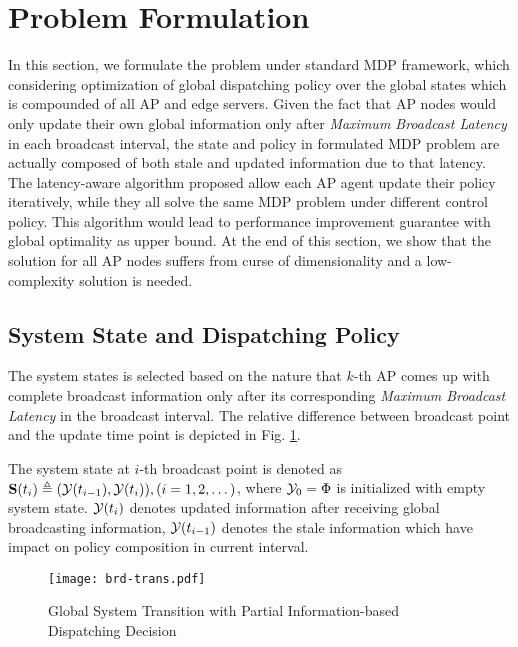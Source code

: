 \section{Problem Formulation}
In this section, we formulate the problem under standard MDP framework, which considering optimization of global dispatching policy over the global states which is compounded of all AP and edge servers.
Given the fact that AP nodes would only update their own global information only after \emph{Maximum Broadcast Latency} in each broadcast interval, the state and policy in formulated MDP problem are actually composed of both stale and updated information due to that latency.
The latency-aware algorithm proposed allow each AP agent update their policy iteratively, while they all solve the same MDP problem under different control policy. This algorithm would lead to performance improvement guarantee with global optimality as upper bound.
At the end of this section, we show that the solution for all AP nodes suffers from curse of dimensionality and a low-complexity solution is needed.

\subsection{System State and Dispatching Policy}
The system states is selected based on the nature that $k$-th AP comes up with complete broadcast information only after its corresponding \emph{Maximum Broadcast Latency} in the broadcast interval.
The relative difference between broadcast point and the update time point is depicted in Fig. \ref{fig:brd-trans}.
\begin{definition}
    The system state at $i$-th broadcast point is denoted as
    $\mathbf{S}(t_i) \triangleq (\mathcal{Y}(t_{i-1}), \mathcal{Y}(t_{i})), (i=1,2,\dots)$,
    where $\mathcal{Y}_{0} =\Phi$ is initialized with empty system state.
    $\mathcal{Y}(t_{i})$ denotes updated information after receiving global broadcasting information, $\mathcal{Y}(t_{i-1})$ denotes the stale information which have impact on policy composition in current interval.
\end{definition}

\begin{figure}[ht]
    \centering
    \texttt{[image: brd-trans.pdf]}
    \caption{Global System Transition with Partial Information-based Dispatching Decision}
    \label{fig:brd-trans}
\end{figure}

